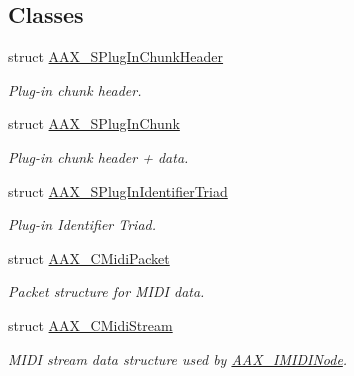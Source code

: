 \subsection*{Classes}
\begin{DoxyCompactItemize}
\item 
struct \hyperlink{a00126}{A\+A\+X\+\_\+\+S\+Plug\+In\+Chunk\+Header}
\begin{DoxyCompactList}\small\item\em Plug-\/in chunk header. \end{DoxyCompactList}\item 
struct \hyperlink{a00125}{A\+A\+X\+\_\+\+S\+Plug\+In\+Chunk}
\begin{DoxyCompactList}\small\item\em Plug-\/in chunk header + data. \end{DoxyCompactList}\item 
struct \hyperlink{a00127}{A\+A\+X\+\_\+\+S\+Plug\+In\+Identifier\+Triad}
\begin{DoxyCompactList}\small\item\em Plug-\/in Identifier Triad. \end{DoxyCompactList}\item 
struct \hyperlink{a00024}{A\+A\+X\+\_\+\+C\+Midi\+Packet}
\begin{DoxyCompactList}\small\item\em Packet structure for M\+I\+D\+I data. \end{DoxyCompactList}\item 
struct \hyperlink{a00025}{A\+A\+X\+\_\+\+C\+Midi\+Stream}
\begin{DoxyCompactList}\small\item\em M\+I\+D\+I stream data structure used by \hyperlink{a00105}{A\+A\+X\+\_\+\+I\+M\+I\+D\+I\+Node}. \end{DoxyCompactList}\end{DoxyCompactItemize}
